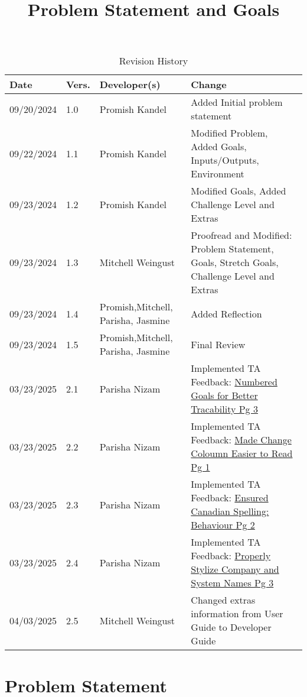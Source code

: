 \documentclass{article}
\title{Problem Statement and Goals\\\progname}
\author{\authname}
\date{}
\begin{document}
\maketitle



\begin{table}[hp]
    \caption{Revision History} \label{TblRevisionHistory}
    \begin{tabularx}{\textwidth}{p{1.5cm}p{1cm}p{3cm}X}
    \toprule {\textbf{Date}} & {\textbf{Vers.}} & {\textbf{Developer(s)}} & {\textbf{Change}}\\
    \midrule
    09/20/2024 & 1.0 & Promish Kandel & Added Initial problem statement\\
    09/22/2024 & 1.1 & Promish Kandel & Modified Problem, Added Goals, Inputs/Outputs, Environment\\
    09/23/2024 & 1.2 & Promish Kandel & Modified Goals, Added Challenge Level and Extras\\
    09/23/2024 & 1.3 & Mitchell Weingust & Proofread and Modified: Problem Statement, Goals, Stretch Goals, Challenge Level and Extras\\
    09/23/2024 & 1.4 & Promish,Mitchell, Parisha, Jasmine & Added Reflection \\
    09/23/2024 & 1.5 & Promish,Mitchell, Parisha, Jasmine & Final Review \\
    03/23/2025 & 2.1 & Parisha Nizam & Implemented TA Feedback: \href{https://github.com/parishanizam/TeleHealth/issues/181}{Numbered Goals for Better Tracability Pg 3} \\
    03/23/2025 & 2.2 & Parisha Nizam & Implemented TA Feedback: \href{https://github.com/parishanizam/TeleHealth/issues/182}{Made Change Coloumn Easier to Read Pg 1} \\
    03/23/2025 & 2.3 & Parisha Nizam & Implemented TA Feedback: \href{https://github.com/parishanizam/TeleHealth/issues/183}{Ensured Canadian Spelling: Behaviour Pg 2} \\
    03/23/2025 & 2.4 & Parisha Nizam & Implemented TA Feedback: \href{https://github.com/parishanizam/TeleHealth/issues/184}{Properly Stylize Company and System Names Pg 3} \\
    04/03/2025 & 2.5 & Mitchell Weingust & Changed extras information from User Guide to Developer Guide\\
    \bottomrule
    \end{tabularx}
\end{table}

\section{Problem Statement}
\end{document}
